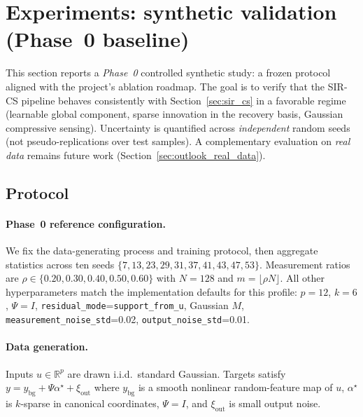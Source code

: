
\section{Experiments: synthetic validation (Phase~0 baseline)}
\label{sec:exp_synthetic}

This section reports a \emph{Phase~0} controlled synthetic study: a frozen protocol aligned with the project's ablation roadmap.
The goal is to verify that the SIR-CS pipeline behaves consistently with Section~\ref{sec:sir_cs} in a favorable regime (learnable global component, sparse innovation in the recovery basis, Gaussian compressive sensing).
Uncertainty is quantified across \emph{independent} random seeds (not pseudo-replications over test samples).
A complementary evaluation on \emph{real data} remains future work (Section~\ref{sec:outlook_real_data}).

\subsection{Protocol}
\label{sec:exp_protocol}

\paragraph{Phase~0 reference configuration.}
We fix the data-generating process and training protocol, then aggregate statistics across ten seeds
$\{7,13,23,29,31,37,41,43,47,53\}$.
Measurement ratios are $\rho \in \{0.20,0.30,0.40,0.50,0.60\}$ with $N=128$ and $m=\lfloor \rho N\rfloor$.
All other hyperparameters match the implementation defaults for this profile: $p=12$, $k=6$, $\Psi=I$, \texttt{residual\_mode}=\texttt{support\_from\_u}, Gaussian $M$, \texttt{measurement\_noise\_std}=0.02, \texttt{output\_noise\_std}=0.01.

\paragraph{Data generation.}
Inputs $u \in \mathbb{R}^{p}$ are drawn i.i.d.\ standard Gaussian.
Targets satisfy $y = y_{\mathrm{bg}} + \Psi \alpha^\star + \xi_{\mathrm{out}}$ where $y_{\mathrm{bg}}$ is a smooth nonlinear random-feature map of $u$, $\alpha^\star$ is $k$-sparse in canonical coordinates, $\Psi=I$, and $\xi_{\mathrm{out}}$ is small output noise.

